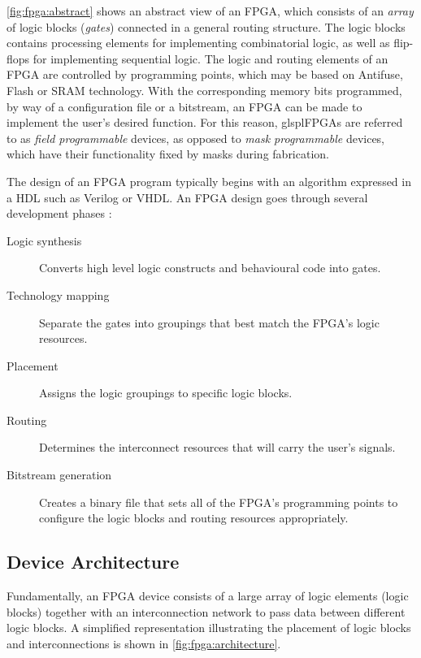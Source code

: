 \autoref{fig:fpga:abstract} shows an abstract view of an \gls{FPGA}, which
consists of an \emph{array} of logic blocks (\emph{gates}) connected in a
general routing structure. The logic blocks contains processing elements for
implementing combinatorial logic, as well as flip-flops for implementing
sequential logic. The logic and routing elements of an \gls{FPGA} are controlled
by programming points, which may be based on Antifuse, Flash or \gls{SRAM}
technology. With the corresponding memory bits programmed, by way of a
configuration file or a bitstream, an \gls{FPGA} can be made to implement the
user's desired function. For this reason, glspl{FPGAs} are referred to as
\emph{field programmable} devices, as opposed to \emph{mask programmable}
devices, which have their  functionality fixed by masks during fabrication.

The design of an \gls{FPGA} program typically begins with an algorithm expressed
in a \gls{HDL} such as Verilog or \gls{VHDL}. An \gls{FPGA} design goes through
several development phases \cite{Hauck:2007}:
\begin{description}
    \item[Logic synthesis] Converts high level logic constructs and behavioural
        code into gates.
    \item[Technology mapping] Separate the gates into groupings that best match
        the \gls{FPGA}'s logic resources.
    \item[Placement] Assigns the logic groupings to specific logic blocks.
    \item[Routing] Determines the interconnect resources that will carry the
        user's signals.
    \item[Bitstream generation] Creates a binary file that sets all of the
        \gls{FPGA}'s programming points to configure the logic blocks and
        routing resources appropriately.
\end{description}

\subsection{Device Architecture}
\label{fpga:architecture}
Fundamentally, an \gls{FPGA} device consists of a large array of logic elements
(logic blocks) together with an interconnection network to pass data between
different logic blocks. A simplified representation illustrating the placement
of logic blocks and interconnections is shown in
\autoref{fig:fpga:architecture}.

